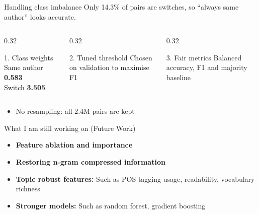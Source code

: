 \documentclass[aspectratio=169,11pt]{beamer}
\begin{document}
\begin{frame}{Handling class imbalance}
Only 14.3\% of pairs are switches, so ``always same author'' looks accurate.
\bigskip

\begin{columns}[T]
\begin{column}{0.32\textwidth}
\begin{block}{1. Class weights}
\centering Same author \textbf{0.583}\\ Switch \textbf{3.505}
\end{block}
\end{column}
\begin{column}{0.32\textwidth}
\begin{block}{2. Tuned threshold}
\centering Chosen on validation to maximise F1
\end{block}
\end{column}
\begin{column}{0.32\textwidth}
\begin{block}{3. Fair metrics}
\centering Balanced accuracy, F1 and majority baseline
\end{block}
\end{column}
\end{columns}
\bigskip

\begin{itemize}
\item No resampling: all 2.4M pairs are kept
\end{itemize}
\end{frame}

\begin{frame}{What I am still working on (Future Work)}
\begin{itemize}\itemsep0.7em
\item \textbf{Feature ablation and importance}
\item \textbf{Restoring n-gram compressed information} 
\item \textbf{Topic robust features:} Such as POS tagging usage, readability, vocabulary richness
\item \textbf{Stronger models:} Such as random forest, gradient boosting
\end{itemize}
\end{frame}
\end{document}
